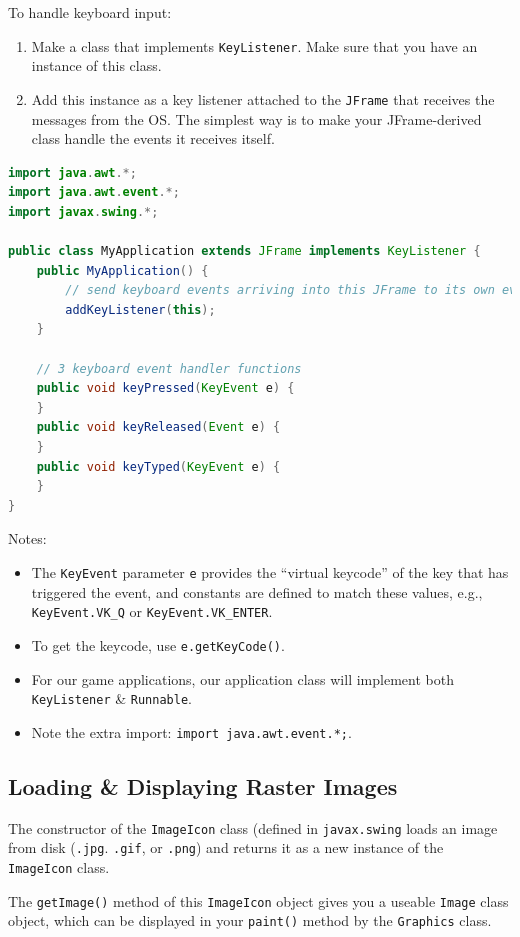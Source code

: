 \documentclass[11pt]{article}
\begin{document}
To handle keyboard input:
\begin{enumerate}
    \item   Make a class that implements \verb|KeyListener|. Make sure that you have an instance of this class. 
    \item   Add this instance as a key listener attached to the \verb|JFrame| that receives the messages from the OS. 
            The simplest way is to make your JFrame-derived class handle the events it receives itself. 
\end{enumerate} 

\begin{lstlisting}[language=Java]
import java.awt.*;
import java.awt.event.*;
import javax.swing.*; 

public class MyApplication extends JFrame implements KeyListener {
    public MyApplication() {
        // send keyboard events arriving into this JFrame to its own event handlers. 
        addKeyListener(this);
    }

    // 3 keyboard event handler functions 
    public void keyPressed(KeyEvent e) {
    }
    public void keyReleased(Event e) {
    }
    public void keyTyped(KeyEvent e) {
    }
}
\end{lstlisting}

Notes:
\begin{itemize}
    \item   The \verb|KeyEvent| parameter \verb|e| provides the ``virtual keycode'' of the key that has triggered the event, and constants are defined to match these values, e.g., \verb|KeyEvent.VK_Q| or \verb|KeyEvent.VK_ENTER|. 
    \item   To get the keycode, use \verb|e.getKeyCode()|.
    \item   For our game applications, our application class will implement both \verb|KeyListener| \& \verb|Runnable|. 
    \item   Note the extra import: \verb|import java.awt.event.*;|. 
\end{itemize}

\subsection{Loading \& Displaying Raster Images}
The constructor of the \verb|ImageIcon| class (defined in \verb|javax.swing| loads an image from disk (\verb|.jpg|. \verb|.gif|, or \verb|.png|) and returns it as a new instance of the \verb|ImageIcon| class. 

The \verb|getImage()| method of this \verb|ImageIcon| object gives you a useable \verb|Image| class object, which can be displayed in your \verb|paint()| method by the \verb|Graphics| class. 
\end{document}
